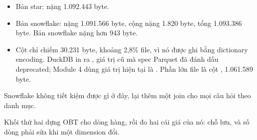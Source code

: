 \begin{itemize}
  \item Bản star:  nặng 1.092.443 byte.
  \item Bản snowflake:  nặng 1.091.566 byte, cộng  nặng 1.820 byte, tổng 1.093.386 byte. Bản snowflake nặng hơn 943 byte.
  \item Cột  chỉ chiếm 30.231 byte, khoảng 2,8\% file, vì nó được ghi bằng dictionary encoding. DuckDB in ra , giá trị cũ mà spec Parquet đã đánh dấu deprecated; Module 4 dùng giá trị hiện tại là . Phần lớn file là cột , 1.061.589 byte.
\end{itemize}

Snowflake không tiết kiệm được gì ở đây, lại thêm một join cho mọi câu hỏi theo danh mục.

Khối thứ hai dựng OBT cho dòng hàng, rồi đo hai cái giá của nó: chỗ lưu, và số dòng phải sửa khi một dimension đổi.

